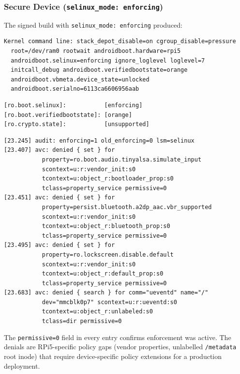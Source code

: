 \subsubsection*{Secure Device (\texttt{selinux\_mode: enforcing})}

The signed build with \texttt{selinux\_mode: enforcing} produced:

\begin{lstlisting}[caption={Kernel command line --- enforcing build}]
Kernel command line: stack_depot_disable=on cgroup_disable=pressure
  root=/dev/ram0 rootwait androidboot.hardware=rpi5
  androidboot.selinux=enforcing ignore_loglevel loglevel=7
  initcall_debug androidboot.verifiedbootstate=orange
  androidboot.vbmeta.device_state=unlocked
  androidboot.serialno=6113ca6606956aab
\end{lstlisting}

\begin{lstlisting}[caption={Selected getprop output --- enforcing build}]
[ro.boot.selinux]:           [enforcing]
[ro.boot.verifiedbootstate]: [orange]
[ro.crypto.state]:           [unsupported]
\end{lstlisting}

\begin{lstlisting}[caption={Policy transition and first AVC denials --- enforcing build}]
[23.245] audit: enforcing=1 old_enforcing=0 lsm=selinux
[23.407] avc: denied { set } for
           property=ro.boot.audio.tinyalsa.simulate_input
           scontext=u:r:vendor_init:s0
           tcontext=u:object_r:bootloader_prop:s0
           tclass=property_service permissive=0
[23.451] avc: denied { set } for
           property=persist.bluetooth.a2dp_aac.vbr_supported
           scontext=u:r:vendor_init:s0
           tcontext=u:object_r:bluetooth_prop:s0
           tclass=property_service permissive=0
[23.495] avc: denied { set } for
           property=ro.lockscreen.disable.default
           scontext=u:r:vendor_init:s0
           tcontext=u:object_r:default_prop:s0
           tclass=property_service permissive=0
[23.683] avc: denied { search } for comm="ueventd" name="/"
           dev="mmcblk0p7" scontext=u:r:ueventd:s0
           tcontext=u:object_r:unlabeled:s0
           tclass=dir permissive=0
\end{lstlisting}

The \texttt{permissive=0} field in every entry confirms enforcement was active. The denials are RPi5-specific policy gaps (vendor properties, unlabelled \texttt{/metadata} root inode) that require device-specific policy extensions for a production deployment.

